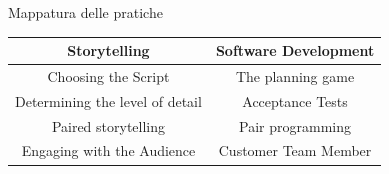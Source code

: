 \documentclass{beamer}
\begin{document}
\begin{frame}{\centerline{Mappatura delle pratiche}}
\setlength{\extrarowheight}{8pt}
\begin{table}[htbp]
\centering
\begin{tabular}{cc}
\hline
\textbf{Storytelling} & \textbf{Software Development} \\
\hline
Choosing the Script & The planning game \\
Determining the level of detail & Acceptance Tests \\
Paired storytelling & Pair programming \\
Engaging with the Audience & Customer Team Member \\
\hline
\end{tabular}
\end{table}

\end{frame}
\end{document}
